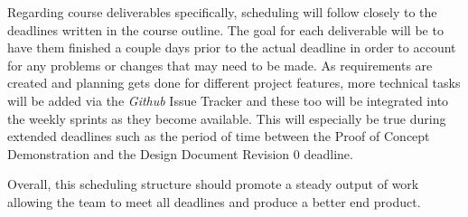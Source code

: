 \documentclass{article}
\begin{document}
Regarding course deliverables specifically, scheduling will follow closely to the deadlines written in the
course outline. The goal for each deliverable will be to have them finished a couple days
prior to the actual deadline in order to account for any problems or changes that may
need to be made. As requirements are created and planning gets done for different project features,
more technical tasks will be added via the \emph{Github} Issue Tracker and these too will be
integrated into the weekly sprints as they become available. This will especially be true during
extended deadlines such as the period of time between the Proof of Concept Demonstration and
the Design Document Revision 0 deadline. \par

Overall, this scheduling structure should promote a steady output of work allowing the team
to meet all deadlines and produce a better end product.
\end{document}
